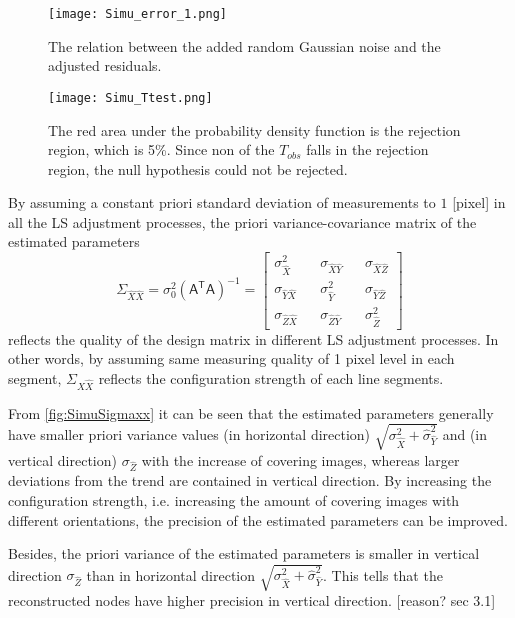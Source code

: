
\begin{figure}
  \centering
  \texttt{[image: Simu\_error\_1.png]}
  \caption{\small The relation between the added random Gaussian noise and the adjusted residuals.}
  \label{fig:SimuError}
  \vspace{1cm}
  \centering
  \texttt{[image: Simu\_Ttest.png]}
  \caption{\small The red area under the probability density function is the rejection region, which is 5\%. Since non of the $T_{obs}$ falls in the rejection region, the null hypothesis could not be rejected.}
  \label{fig:SimuTtest}
\end{figure}

\clearpage


By assuming a constant priori standard deviation of measurements to $1$ [pixel] in all the LS adjustment processes, the priori variance-covariance matrix of the estimated parameters
\begin{equation}
\Sigma_{\hat{X}\hat{X}}=\sigma_0^2(\mathsf{A^TA})^{-1}=
\begin{bmatrix}
\sigma_{\hat{X}}^2 && \sigma_{\hat{X}\hat{Y}} && \sigma_{\hat{X}\hat{Z}} \\
\sigma_{\hat{Y}\hat{X}} && \sigma_{\hat{Y}}^2 && \sigma_{\hat{Y}\hat{Z}} \\
\sigma_{\hat{Z}\hat{X}} && \sigma_{\hat{Z}\hat{Y}} && \sigma_{\hat{Z}}^2
\end{bmatrix}
\end{equation}
reflects the quality of the design matrix in different LS adjustment processes. In other words, by assuming same measuring quality of 1 pixel level in each segment, $\Sigma_{\hat{X}\hat{X}}$ reflects the configuration strength of each line segments.


From \cref{fig:SimuSigmaxx} it can be seen that the estimated parameters generally have smaller priori variance values (in horizontal direction) $\sqrt{\sigma_{\hat{X}}^2+\hat{\sigma}_{\hat{Y}}^2}$ and (in vertical direction) $\sigma_{\hat{Z}}$ with the increase of covering images, whereas larger deviations from the trend are contained in vertical direction. {By increasing the configuration strength, i.e. increasing the amount of covering images with different orientations, the precision of the estimated parameters can be improved}.

Besides, the priori variance of the estimated parameters is smaller in vertical direction $\sigma_{\hat{Z}}$ than in horizontal direction $\sqrt{\sigma_{\hat{X}}^2+\hat{\sigma}_{\hat{Y}}^2}$. This tells that {the reconstructed nodes have higher precision in vertical direction}. [reason? sec 3.1]


